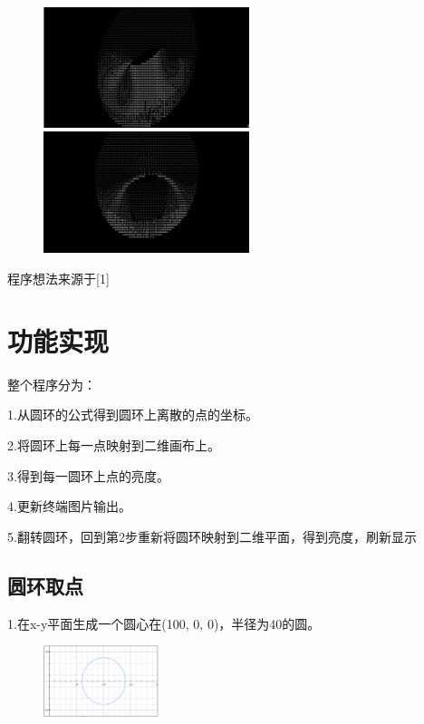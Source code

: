 \documentclass[UTF8]{ctexart}
\begin{document}
\begin{figure}[htbp]
  \centering
  \begin{minipage}[t]{0.48\textwidth}
    \centering
    \includegraphics[width=6cm]{images/donout3.png}
  \end{minipage}
  \begin{minipage}[t]{0.48\textwidth}
    \centering
    \includegraphics[width=6cm]{images/donout4.png}
  \end{minipage}
\end{figure}

程序想法来源于[1]

\section{功能实现}

整个程序分为：

\quad 1.从圆环的公式得到圆环上离散的点的坐标。

\quad 2.将圆环上每一点映射到二维画布上。

\quad 3.得到每一圆环上点的亮度。

\qaud 4.更新终端图片输出。

\quad 5.翻转圆环，回到第2步重新将圆环映射到二维平面，得到亮度，刷新显示

\subsection{圆环取点}

1.在x-y平面生成一个圆心在(100, 0, 0)，半径为40的圆。
\begin{figure}[H] %
  \centering %
  \includegraphics[width=0.3\textwidth]{images/2d-circle.png} %
\end{figure}
\end{document}
